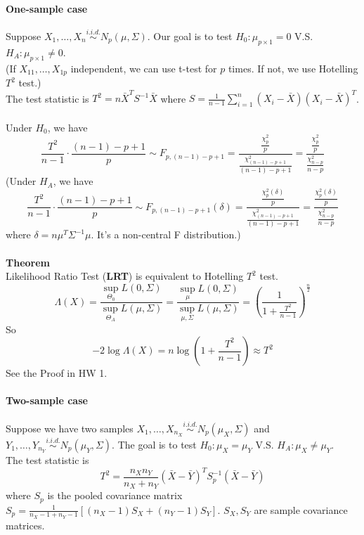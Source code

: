 \documentclass[12pt]{book}
\theoremstyle{definition}
\theoremstyle{remark}
\begin{document}
\paragraph{One-sample case}
Suppose $X_1, \dots, X_n \overset{i.i.d.}{\sim} N_p(\mu, \Sigma)$. Our goal is to test $H_0: \mu_{p\times 1} = 0$ V.S. $H_A: \mu_{p\times 1} \ne 0$.\\
(If $X_{11},\dots, X_{1p}$ independent, we can use t-test for $p$ times. If not, we use Hotelling $T^2$ test.)\\
The test statistic is $T^2 = n\bar{X}^TS^{-1}\bar{X}$ where $S = \frac{1}{n-1}\sum_{i=1}^n(X_i-\bar{X})(X_i-\bar{X})^T$.\\
\\
Under $H_0$, we have
\[\frac{T^2}{n-1}\cdot \frac{(n-1)-p+1}{p}\sim F_{p, (n-1)-p+1} = \frac{\frac{\chi^2_p}{p}}{\frac{\chi^2_{(n-1)-p+1}}{(n-1)-p+1}} = \frac{\frac{\chi^2_p}{p}}{\frac{\chi^2_{n-p}}{n-p}}\]
(Under $H_A$, we have
\[\frac{T^2}{n-1}\cdot \frac{(n-1)-p+1}{p}\sim F_{p, (n-1)-p+1}(\delta) = \frac{\frac{\chi^2_p(\delta)}{p}}{\frac{\chi^2_{(n-1)-p+1}}{(n-1)-p+1}} = \frac{\frac{\chi^2_p(\delta)}{p}}{\frac{\chi^2_{n-p}}{n-p}}\]where $\delta = n\mu^T\Sigma^{-1}\mu$. It's a non-central F distribution.)\\
\\
\textbf{Theorem}\\
Likelihood Ratio Test (\textbf{LRT}) is equivalent to Hotelling $T^2$ test.
\[\Lambda(X) = \frac{\underset{\Theta_0}{\sup}L(0,\Sigma)}{\underset{\Theta_A}{\sup}L(\mu,\Sigma)} = \frac{\underset{\mu}{\sup}L(0,\Sigma)}{\underset{\mu, \Sigma}{\sup}L(\mu,\Sigma)} = (\frac{1}{1+\frac{T^2}{n-1}})^{\frac{n}{2}}\]
So \[-2\log\Lambda(X) = n\log(1+\frac{T^2}{n-1}) \approx T^2\]
See the Proof in HW 1.\\



\paragraph{Two-sample case}
Suppose we have two samples $X_1, \dots, X_{n_X} \overset{i.i.d.}{\sim} N_p(\mu_X, \Sigma)$ and $Y_1, \dots, Y_{n_Y} \overset{i.i.d.}{\sim} N_p(\mu_Y, \Sigma)$. The goal is to test $H_0: \mu_{X} = \mu_Y$ V.S. $H_A: \mu_{X} \ne \mu_Y$.\\
The test statistic is 
\[T^2 = \frac{n_Xn_Y}{n_X+n_Y}(\bar{X}-\bar{Y})^TS_p^{-1}(\bar{X}-\bar{Y})\]
where $S_p$ is the pooled covariance matrix $S_p = \frac{1}{n_X-1+n_Y-1}[(n_X-1)S_X+(n_Y-1)S_Y]$. $S_X, S_Y$ are sample covariance matrices.\\
\end{document}
